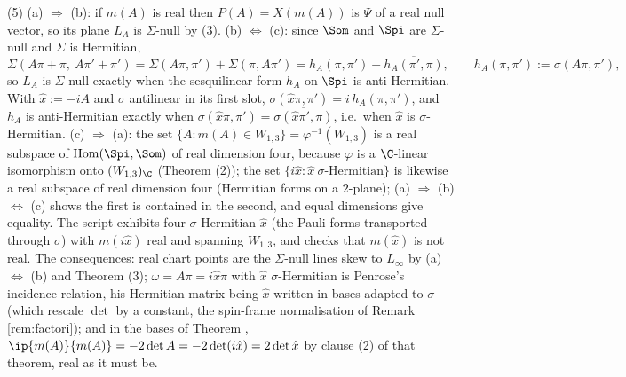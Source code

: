 (5) (a) $\Rightarrow$ (b): if $m(A)$ is real then $P(A) = X(m(A))$ is $\Psi$ of a real null vector, so its plane $L_A$ is $\Sigma$-null by (3). (b) $\Leftrightarrow$ (c): since $\Som$ and $\Spi$ are $\Sigma$-null and $\Sigma$ is Hermitian,
\[
\Sigma(A\pi + \pi,\ A\pi' + \pi') = \Sigma(A\pi, \pi') + \Sigma(\pi, A\pi') = h_A(\pi,\pi') + \overline{h_A(\pi',\pi)}, \qquad h_A(\pi,\pi') := \sigma(A\pi, \pi'),
\]
so $L_A$ is $\Sigma$-null exactly when the sesquilinear form $h_A$ on $\Spi$ is anti-Hermitian. With $\hat x := -iA$ and $\sigma$ antilinear in its first slot, $\sigma(\hat x\pi, \pi') = i\,h_A(\pi,\pi')$, and $h_A$ is anti-Hermitian exactly when $\sigma(\hat x\pi,\pi') = \overline{\sigma(\hat x\pi',\pi)}$, i.e.\ when $\hat x$ is $\sigma$-Hermitian. (c) $\Rightarrow$ (a): the set $\{A : m(A) \in W_{1,3}\} = \varphi^{-1}(W_{1,3})$ is a real subspace of $\operatorname{Hom}(\Spi,\Som)$ of real dimension four, because $\varphi$ is a $\C$-linear isomorphism onto $(W_{1,3})_\C$ (Theorem (2)); the set $\{i\hat x : \hat x\ \sigma\text{-Hermitian}\}$ is likewise a real subspace of real dimension four (Hermitian forms on a $2$-plane); (a) $\Rightarrow$ (b) $\Leftrightarrow$ (c) shows the first is contained in the second, and equal dimensions give equality. The script exhibits four $\sigma$-Hermitian $\hat x$ (the Pauli forms transported through $\sigma$) with $m(i\hat x)$ real and spanning $W_{1,3}$, and checks that $m(\hat x)$ is not real. The consequences: real chart points are the $\Sigma$-null lines skew to $L_\infty$ by (a) $\Leftrightarrow$ (b) and Theorem (3); $\omega = A\pi = i\hat x\pi$ with $\hat x$ $\sigma$-Hermitian is Penrose's incidence relation, his Hermitian matrix being $\hat x$ written in bases adapted to $\sigma$ (which rescale $\det$ by a constant, the spin-frame normalisation of Remark \ref{rem:factori}); and in the bases of Theorem , $\ip{m(A)}{m(A)} = -2\det A = -2\det(i\hat x) = 2\det\hat x$ by clause (2) of that theorem, real as it must be.
